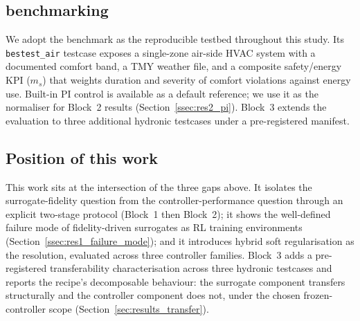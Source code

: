 \subsection{\boptest{} benchmarking}
\label{ssec:rw_boptest}

We adopt the \boptest{} benchmark \citep{Blum2021BOPTEST,
BOPTESTrepo} as the reproducible testbed
throughout this study. Its \texttt{bestest\_air} testcase exposes a
single-zone air-side HVAC system with a documented comfort band, a
TMY weather file, and a composite safety/energy KPI ($m_s$) that
weights duration and severity of comfort violations against energy
use. Built-in PI control is available as a default reference; we use
it as the normaliser for Block~2 results
(Section~\ref{ssec:res2_pi}). Block~3 extends the evaluation to three
additional \boptest{} hydronic testcases under a pre-registered
manifest.

\subsection{Position of this work}
\label{ssec:rw_position}

This work sits at the intersection of the three gaps above. It
isolates the surrogate-fidelity question from the controller-performance
question through an explicit two-stage protocol (Block~1 then Block~2);
it shows the well-defined failure mode of fidelity-driven surrogates
as RL training environments
(Section~\ref{ssec:res1_failure_mode}); and it introduces hybrid
soft regularisation as the resolution, evaluated across three
controller families. Block~3 adds a pre-registered transferability
characterisation across three hydronic \boptest{} testcases and
reports the recipe's decomposable behaviour: the surrogate component
transfers structurally and the controller component does not, under
the chosen frozen-controller scope
(Section~\ref{sec:results_transfer}).
